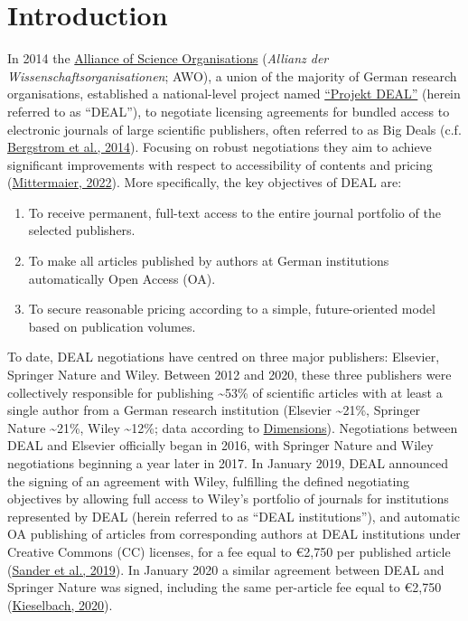 \documentclass[
]{article}
\providecommand{\tightlist}{%
  \setlength{\itemsep}{0pt}\setlength{\parskip}{0pt}}
\begin{document}
\pagebreak

\hypertarget{introduction}{%
\section{Introduction}\label{introduction}}

In 2014 the \href{https://wissenschaftsfreiheit.de/}{Alliance of Science Organisations} (\emph{Allianz der Wissenschaftsorganisationen}; AWO), a union of the majority of German research organisations, established a national-level project named \href{https://www.projekt-deal.de}{``Projekt DEAL''} (herein referred to as ``DEAL''), to negotiate licensing agreements for bundled access to electronic journals of large scientific publishers, often referred to as Big Deals (c.f. \href{https://doi.org/10.1073/pnas.1403006111}{Bergstrom et al., 2014}). Focusing on robust negotiations they aim to achieve significant improvements with respect to accessibility of contents and pricing (\href{http://hdl.handle.net/2128/31158}{Mittermaier, 2022}). More specifically, the key objectives of DEAL are:

\begin{enumerate}
\def\labelenumi{\arabic{enumi}.}
\tightlist
\item
  To receive permanent, full-text access to the entire journal portfolio of the selected publishers.
\item
  To make all articles published by authors at German institutions automatically Open Access (OA).
\item
  To secure reasonable pricing according to a simple, future-oriented model based on publication volumes.
\end{enumerate}

To date, DEAL negotiations have centred on three major publishers: Elsevier, Springer Nature and Wiley. Between 2012 and 2020, these three publishers were collectively responsible for publishing \textasciitilde53\% of scientific articles with at least a single author from a German research institution (Elsevier \textasciitilde21\%, Springer Nature \textasciitilde21\%, Wiley \textasciitilde12\%; data according to \href{https://www.dimensions.ai/}{Dimensions}). Negotiations between DEAL and Elsevier officially began in 2016, with Springer Nature and Wiley negotiations beginning a year later in 2017. In January 2019, DEAL announced the signing of an agreement with Wiley, fulfilling the defined negotiating objectives by allowing full access to Wiley's portfolio of journals for institutions represented by DEAL (herein referred to as ``DEAL institutions''), and automatic OA publishing of articles from corresponding authors at DEAL institutions under Creative Commons (CC) licenses, for a fee equal to €2,750 per published article (\href{https://doi.org/10.17617/2.3027595}{Sander et al., 2019}). In January 2020 a similar agreement between DEAL and Springer Nature was signed, including the same per-article fee equal to €2,750 (\href{https://doi.org/10.17617/2.3174351}{Kieselbach, 2020}).
\end{document}
